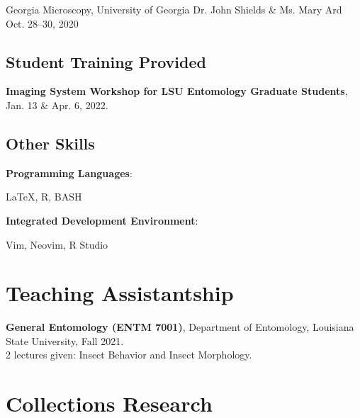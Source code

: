 \documentclass{article}
\newcommand{\hindent}{\hangindent=10pt}
\begin{document}
{Georgia Microscopy, University of Georgia}
{Dr. John Shields \& Ms. Mary Ard}
{Oct. 28--30, 2020}

\subsection{Student Training Provided}
\textbf{Imaging System Workshop for LSU Entomology Graduate Students}, 
\small{Jan. 13 \& Apr. 6, 2022.}\normalsize

\subsection{Other Skills}
\newcommand{\skills}[2]{
    \noindent
    \begin{minipage}[t]{.50\textwidth}
    \textbf{#1}:
    \end{minipage}
    \begin{minipage}[t]{.45\textwidth}
    {#2}\hfill
    \end{minipage}
    \normalsize \par
}

\skills{Programming Languages}{\LaTeX, R, BASH}
\skills{Integrated Development Environment}{Vim, Neovim, R Studio}

\section{Teaching Assistantship}
\newcommand{\TA}[5]{
    \noindent
    \hindent
    \textbf{#1}, %
    {#2}, %
    {#3}, %
    {#4}.\\ %
    \small{#5}. %
    \normalsize\par
}

\TA{General Entomology (ENTM 7001)}
{Department of Entomology}
{Louisiana State University}
{Fall 2021}
{2 lectures given: Insect Behavior and Insect Morphology}

\section{Collections Research}
\newcommand{\entryA}[3]{
    \noindent
    \begin{minipage}[t]{.73\textwidth}
    \textbf{#1}
    \small{#2}
    \end{minipage}
    \begin{minipage}[t]{.25\textwidth}
    \hfill{#3}
    \end{minipage}
    \normalsize \par
}
\end{document}
